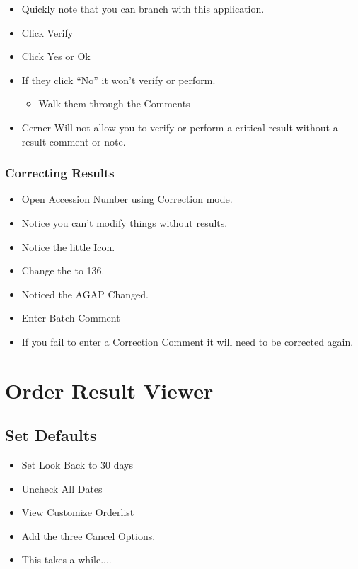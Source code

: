 \begin{itemize}
    \item Quickly note that you can branch with this application.
    \item Click Verify
    \item Click Yes or Ok
    \item If they click ``No'' it won't verify or perform.
    \begin{itemize}
        \item Walk them through the Comments
    \end{itemize}
    \item Cerner Will not allow you to verify or perform a critical result without a result comment or note.
\end{itemize}

\subsection{Correcting Results}

\begin{itemize}
    \item Open Accession Number using Correction mode.
    \item Notice you can't modify things without results.
    \item Notice the little Icon.
    \item Change the  to 136.
    \item Noticed the AGAP Changed.
    \item Enter Batch Comment 
    \item If you fail to enter a Correction Comment it will need to be corrected again.
\end{itemize}

\chapter{Order Result Viewer}

\section{Set Defaults}
    \begin{itemize}
        \item Set Look Back to 30 days
        \item Uncheck All Dates
    \end{itemize}
    \begin{itemize}
        \item View \faArrowRight Customize \faArrowRight Orderlist
        \item Add the three Cancel Options.
        \item This takes a while....
    \end{itemize}

